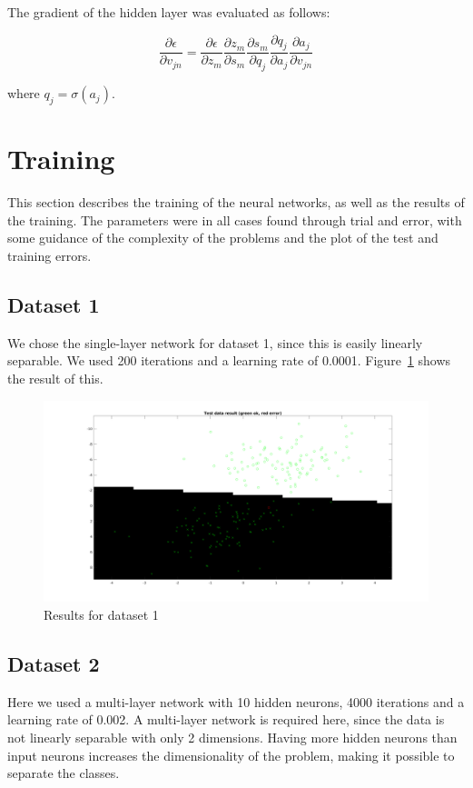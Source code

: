 \documentclass{article}
\begin{document}
The gradient of the hidden layer was evaluated as follows:

\begin{equation}
  \frac{\partial \epsilon}{\partial v_{jn}} =
  \frac{\partial \epsilon}{\partial z_m}
  \frac{\partial z_m}{\partial s_m}
  \frac{\partial s_m}{\partial q_j}
  \frac{\partial q_j}{\partial a_j}
  \frac{\partial a_j}{\partial v_{jn}}
\end{equation}

where $q_j = \sigma(a_j)$.

\section{Training}

This section describes the training of the neural networks, as well as the
results of the training. The parameters were in all cases found through trial
and error, with some guidance of the complexity of the problems and the
plot of the test and training errors.

\subsection{Dataset 1}

We chose the single-layer network for dataset 1, since this is easily
linearly separable. We used 200 iterations and a learning rate of
0.0001. Figure~\ref{fig:res1} shows the result of this.

\begin{figure}[h!]
    \label{fig:res1}
    \includegraphics[width=13cm]{dataset1res.png}
    \caption{Results for dataset 1}
\end{figure}

\subsection{Dataset 2}
Here we used a multi-layer network with 10 hidden neurons, 4000 iterations and a
learning rate of 0.002. A multi-layer network is required here, since the data
is not linearly separable with only 2 dimensions. Having more hidden neurons
than input neurons increases the dimensionality of the problem, making it
possible to separate the classes.
\end{document}
